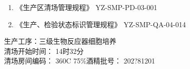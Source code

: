 \documentclass[UTF8,10pt,a4paper,fontset=fandol]{ctexart}
\newcommand{\fieldvalue}[1]{#1}
\newcommand{\handwritten}[1]{#1}
\begin{document}
\begin{enumerate}
\item 《生产区清场管理规程》 \hfill YZ-SMP-PD-03-001
\item 《生产、检验状态标识管理规程》 \hfill YZ-SMP-QA-04-014
\end{enumerate}

\noindent
生产工序：三级生物反应器细胞培养\\
清场开始时间：
\fieldvalue{\handwritten{14时32分}}\\
清场房间编码：
\fieldvalue{\handwritten{360C}}
\hfill
75\%酒精批号：
\fieldvalue{\handwritten{202?81201}}

\vspace{2mm}
\end{document}
